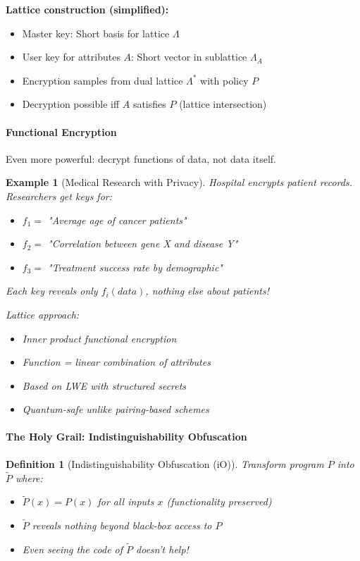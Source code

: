 \documentclass[11pt,a4paper]{article}
\newtheorem{definition}{Definition}
\newtheorem{example}{Example}
\begin{document}
\textbf{Lattice construction (simplified):}
\begin{itemize}
    \item Master key: Short basis for lattice $\Lambda$
    \item User key for attributes $A$: Short vector in sublattice $\Lambda_A$
    \item Encryption samples from dual lattice $\Lambda^*$ with policy $P$
    \item Decryption possible iff $A$ satisfies $P$ (lattice intersection)
\end{itemize}

\paragraph{Functional Encryption}

Even more powerful: decrypt functions of data, not data itself.

\begin{example}[Medical Research with Privacy]
Hospital encrypts patient records. Researchers get keys for:
\begin{itemize}
    \item $f_1 = $ "Average age of cancer patients"
    \item $f_2 = $ "Correlation between gene X and disease Y"
    \item $f_3 = $ "Treatment success rate by demographic"
\end{itemize}

Each key reveals only $f_i(data)$, nothing else about patients!

Lattice approach:
\begin{itemize}
    \item Inner product functional encryption
    \item Function = linear combination of attributes
    \item Based on LWE with structured secrets
    \item Quantum-safe unlike pairing-based schemes
\end{itemize}
\end{example}

\paragraph{The Holy Grail: Indistinguishability Obfuscation}

\begin{definition}[Indistinguishability Obfuscation (iO)]
Transform program $P$ into $\tilde{P}$ where:
\begin{itemize}
    \item $\tilde{P}(x) = P(x)$ for all inputs $x$ (functionality preserved)
    \item $\tilde{P}$ reveals nothing beyond black-box access to $P$
    \item Even seeing the code of $\tilde{P}$ doesn't help!
\end{itemize}
\end{definition}
\end{document}
